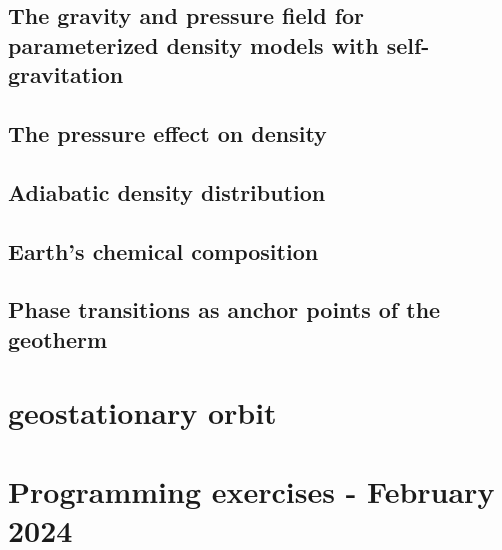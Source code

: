 \subsection{The gravity and pressure field for parameterized density models with self-gravitation}
\label{sect_param_densmod}  %
\subsection{The pressure effect on density} %
\label{Pressure_density}  %
\subsection{Adiabatic density distribution} %
\label{Adiabatic density distribution}  %
\subsection{Earth's chemical composition} %
\label{section-chemical-composition}  %
\subsection{Phase transitions as anchor points of the geotherm} %
\label{section-anchor points}  %

\section{geostationary orbit}


\newpage
\section{Programming exercises - February 2024 \label{exgravptmass}} 

\newpage
